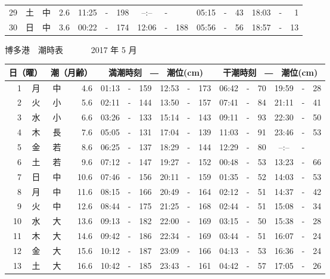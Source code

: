 \documentclass[12pt.a4j]{jsarticle}
\begin{document}
\begin{center}
\begin{table}[ht]
\begin{tabular}{|rc|cr|ccrccr|ccrccr|}
29 & 土 & 中 &  2.6 &  11:25 &-& 198  &  --:-- &-&     &   05:15 &-&  43  &   18:03 &-&   1  \\
30 & 日 & 中 &  3.6 &  00:22 &-& 174  &  12:06 &-& 188  &   05:56 &-&  56  &   18:57 &-&  13  \\
   \hline
   \end{tabular}
\end{table}
\newpage
 {\LARGE 博多港　潮時表　　　}
 {\large 2017 年  5 月}\\
 \begin{table}[ht]
    \begin{tabular}{|rc|cr|ccrccr|ccrccr|}
    \hline
    \multicolumn{2}{|c|}{日（曜）} & \multicolumn{2}{c|}{潮（月齢）} & \multicolumn{6}{c|}{満潮時刻　―　潮位(cm)} & \multicolumn{6}{c|}{干潮時刻　―　潮位(cm)} \\
 \hline
 1 & 月 & 中 &  4.6 &  01:13 &-& 159  &  12:53 &-& 173  &   06:42 &-&  70  &   19:59 &-&  28  \\
 2 & 火 & 小 &  5.6 &  02:11 &-& 144  &  13:50 &-& 157  &   07:41 &-&  84  &   21:11 &-&  41  \\
 3 & 水 & 小 &  6.6 &  03:26 &-& 133  &  15:14 &-& 143  &   09:11 &-&  93  &   22:30 &-&  50  \\
 4 & 木 & 長 &  7.6 &  05:05 &-& 131  &  17:04 &-& 139  &   11:03 &-&  91  &   23:46 &-&  53  \\
 5 & 金 & 若 &  8.6 &  06:25 &-& 137  &  18:29 &-& 144  &   12:29 &-&  80  &   --:-- &-&     \\
 6 & 土 & 若 &  9.6 &  07:12 &-& 147  &  19:27 &-& 152  &   00:48 &-&  53  &   13:23 &-&  66  \\
 7 & 日 & 中 & 10.6 &  07:46 &-& 156  &  20:11 &-& 159  &   01:35 &-&  52  &   14:03 &-&  53  \\
 8 & 月 & 中 & 11.6 &  08:15 &-& 166  &  20:49 &-& 164  &   02:12 &-&  51  &   14:37 &-&  42  \\
 9 & 火 & 中 & 12.6 &  08:44 &-& 175  &  21:25 &-& 168  &   02:44 &-&  51  &   15:08 &-&  34  \\
10 & 水 & 大 & 13.6 &  09:13 &-& 182  &  22:00 &-& 169  &   03:15 &-&  50  &   15:38 &-&  28  \\
11 & 木 & 大 & 14.6 &  09:42 &-& 186  &  22:34 &-& 169  &   03:44 &-&  51  &   16:07 &-&  24  \\
12 & 金 & 大 & 15.6 &  10:12 &-& 187  &  23:09 &-& 166  &   04:13 &-&  53  &   16:36 &-&  24  \\
13 & 土 & 大 & 16.6 &  10:42 &-& 185  &  23:43 &-& 161  &   04:42 &-&  57  &   17:05 &-&  26  \\

\end{tabular}
\end{table}
\end{center}
\end{document}
